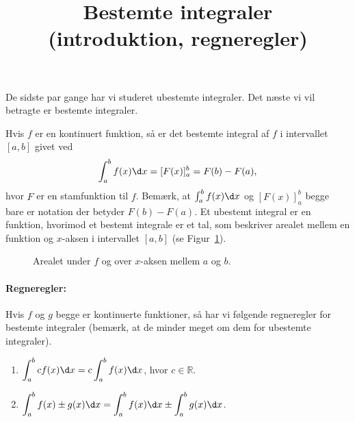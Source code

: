 \title{\Huge \textbf{Bestemte integraler \\(introduktion, regneregler)}\vspace{-1.5cm}}
\date{}
\author{}
\maketitle
\noindent De sidste par gange har vi studeret ubestemte integraler. Det næste vi vil betragte er bestemte integraler. 

Hvis $f$ er en kontinuert funktion, så er det bestemte integral af $f$ i intervallet $[a,b]$ givet ved
\begin{align*}
\int_a^b f(x) \d x = [F(x)]^b_a = F(b)-F(a),
\end{align*}
hvor $F$ er en stamfunktion til $f$. Bemærk, at $\int_a^b f(x) \d x$ og $[F(x)]_a^b$ begge bare er notation der betyder $F(b)-F(a)$. Et ubestemt integral er en funktion, hvorimod et bestemt integrale er et tal, som beskriver arealet mellem en funktion og $x$-aksen i intervallet $[a,b]$ (se Figur~\ref{fig:bestemtint1et}).
\begin{figure}[!htbp]
  \centering
  \caption{Arealet under $f$ og over $x$-aksen mellem $a$ og $b$.}
  \label{fig:bestemtint1et}
\end{figure}

\paragraph*{Regneregler:}
Hvis $f$ og $g$ begge er kontinuerte funktioner, så har vi følgende regneregler for bestemte integraler (bemærk, at de minder meget om dem for ubestemte integraler).
\begin{enumerate}
\item $\displaystyle \int_a^b cf(x) \d x = c \int_a^b f(x) \d x$, hvor $c \in \mathbb{R}$.
\item $\displaystyle \int_a^b f(x) \pm g(x) \d x = \int_a^b f(x) \d x \pm \int_a^b g(x) \d x$.
\end{enumerate}

